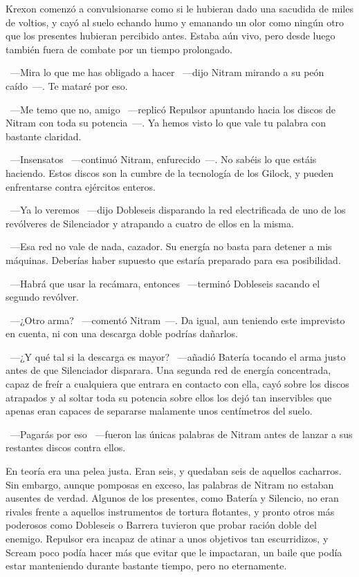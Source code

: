Krexon comenzó a convulsionarse como si le hubieran dado una sacudida de miles de voltios, y cayó al suelo echando humo y emanando un olor como ningún otro que los presentes hubieran percibido antes. Estaba aún vivo, pero desde luego también fuera de combate por un tiempo prolongado.

~---Mira lo que me has obligado a hacer ~---dijo Nitram mirando a su peón caído~---. Te mataré por eso.

~---Me temo que no, amigo ~---replicó Repulsor apuntando hacia los discos de Nitram con toda su potencia~---. Ya hemos visto lo que vale tu palabra con bastante claridad.

~---Insensatos ~---continuó Nitram, enfurecido~---. No sabéis lo que estáis haciendo. Estos discos son la cumbre de la tecnología de los Gilock, y pueden enfrentarse contra ejércitos enteros.

~---Ya lo veremos ~---dijo Dobleseis disparando la red electrificada de uno de los revólveres de Silenciador y atrapando a cuatro de ellos en la misma.

~---Esa red no vale de nada, cazador. Su energía no basta para detener a mis máquinas. Deberías haber supuesto que estaría preparado para esa posibilidad.

~---Habrá que usar la recámara, entonces ~---terminó Dobleseis sacando el segundo revólver.

~---¿Otro arma? ~---comentó Nitram~---. Da igual, aun teniendo este imprevisto en cuenta, ni con una descarga doble podrías dañarlos.

~---¿Y qué tal si la descarga es mayor? ~---añadió Batería tocando el arma justo antes de que Silenciador disparara. Una segunda red de energía concentrada, capaz de freír a cualquiera que entrara en contacto con ella, cayó sobre los discos atrapados y al soltar toda su potencia sobre ellos los dejó tan inservibles que apenas eran capaces de separarse malamente unos centímetros del suelo.

~---Pagarás por eso ~---fueron las únicas palabras de Nitram antes de lanzar a sus restantes discos contra ellos.

En teoría era una pelea justa. Eran seis, y quedaban seis de aquellos cacharros. Sin embargo, aunque pomposas en exceso, las palabras de Nitram no estaban ausentes de verdad. Algunos de los presentes, como Batería y Silencio, no eran rivales frente a aquellos instrumentos de tortura flotantes, y pronto otros más poderosos como Dobleseis o Barrera tuvieron que probar ración doble del enemigo. Repulsor era incapaz de atinar a unos objetivos tan escurridizos, y Scream poco podía hacer más que evitar que le impactaran, un baile que podía estar manteniendo durante bastante tiempo, pero no eternamente.

